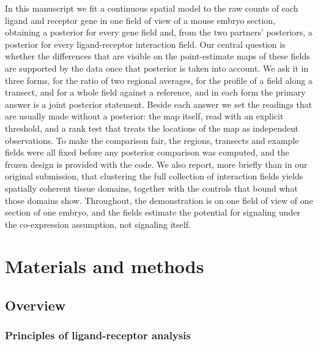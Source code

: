 \documentclass[10pt,letterpaper]{article}
\begin{document}
In this manuscript we fit a continuous spatial model to the raw counts of each ligand and receptor gene in one field of view of a mouse embryo section, obtaining a posterior for every gene field and, from the two partners' posteriors, a posterior for every ligand-receptor interaction field. Our central question is whether the differences that are visible on the point-estimate maps of these fields are supported by the data once that posterior is taken into account. We ask it in three forms, for the ratio of two regional averages, for the profile of a field along a transect, and for a whole field against a reference, and in each form the primary answer is a joint posterior statement. Beside each answer we set the readings that are usually made without a posterior: the map itself, read with an explicit threshold, and a rank test that treats the locations of the map as independent observations. To make the comparison fair, the regions, transects and example fields were all fixed before any posterior comparison was computed, and the frozen design is provided with the code. We also report, more briefly than in our original submission, that clustering the full collection of interaction fields yields spatially coherent tissue domains, together with the controls that bound what those domains show. Throughout, the demonstration is on one field of view of one section of one embryo, and the fields estimate the potential for signaling under the co-expression assumption, not signaling itself.

\section*{Materials and methods}\label{sec:materials}

\subsection*{Overview}

\subsubsection*{Principles of ligand-receptor analysis}
\end{document}
